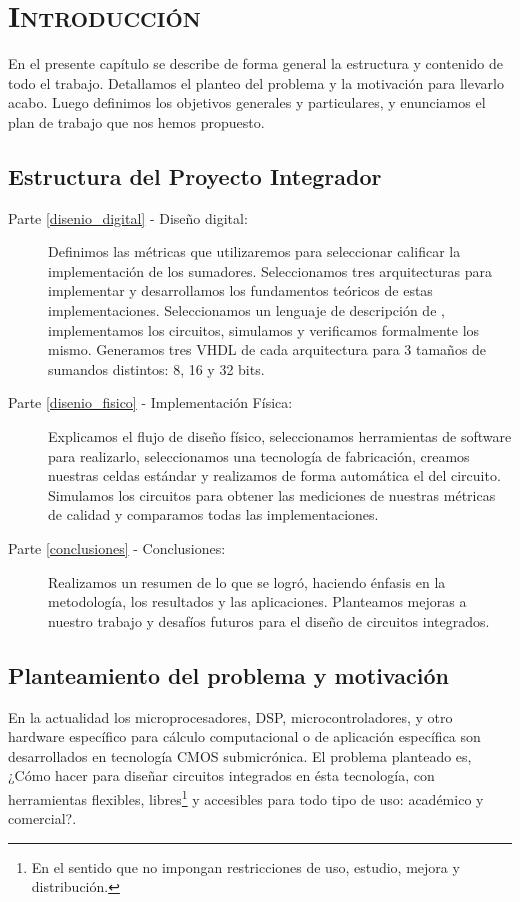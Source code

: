 \chapter{ \textsc{ Introducción } }
En el presente capítulo se describe de forma general la estructura y contenido de todo el trabajo. Detallamos el planteo del problema y la motivación para llevarlo acabo. Luego definimos los objetivos generales y particulares, y enunciamos el plan de trabajo que nos hemos propuesto.
\section{Estructura del Proyecto Integrador}

\begin{description}
\item[Parte \ref{disenio_digital} - Diseño digital:] Definimos las métricas que utilizaremos para seleccionar calificar la implementación de los sumadores. Seleccionamos tres arquitecturas para implementar y desarrollamos los fundamentos teóricos de estas implementaciones. Seleccionamos un lenguaje de descripción de , implementamos los circuitos, simulamos y verificamos formalmente los mismo. Generamos tres \netlist VHDL de cada arquitectura para 3 tamaños de sumandos distintos: 8, 16 y 32 bits.
\item[Parte \ref{disenio_fisico} - Implementación Física:] Explicamos el flujo de diseño físico, seleccionamos herramientas de software para realizarlo, seleccionamos una tecnología de fabricación, creamos nuestras celdas estándar y realizamos de forma automática el \layout del circuito. Simulamos los circuitos para obtener las mediciones de nuestras métricas de calidad y comparamos todas las implementaciones.
\item[Parte \ref{conclusiones} - Conclusiones:] Realizamos un resumen de lo que se logró, haciendo énfasis en la metodología, los resultados y las aplicaciones. Planteamos mejoras a nuestro trabajo y desafíos futuros para el diseño de circuitos integrados.
\end{description}


\section{Planteamiento del problema y motivación}
En la actualidad los microprocesadores, DSP, microcontroladores, y otro hardware específico para cálculo computacional o de aplicación específica son desarrollados en tecnología CMOS submicrónica. El problema planteado es, ¿Cómo hacer para diseñar circuitos integrados en ésta tecnología, con herramientas flexibles, libres\footnote{En el sentido que no impongan restricciones de uso, estudio, mejora y distribución.} y accesibles para todo tipo de uso: académico y comercial?.

